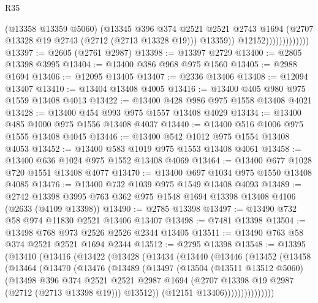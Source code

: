 \begin{lexlean}{R35}
\begin{coremodule}
                                (@13358 @13359 @5060)
                                (@13345
                                  @396
                                  @374
                                  @2521
                                  @2521
                                  @2743
                                  @1694
                                  (@2707 @13328 @19 @2743 (@2712 (@2713 @13328 @19)))
                                  @13359))
                              @12152)))))))))))))
@13397 := @2605 (@2761 @2987)
@13398 := @13397 @2729
@13400 := @2805 @13398 @3995
@13404 := @13400 @386 @968 @975 @1560
@13405 := @2988 @1694
@13406 := @12095 @13405
@13407 := @2336 @13406
@13408 := @12094 @13407
@13410 := @13404 @13408 @4005
@13416 := @13400 @405 @980 @975 @1559 @13408 @4013
@13422 := @13400 @428 @986 @975 @1558 @13408 @4021
@13428 := @13400 @454 @993 @975 @1557 @13408 @4029
@13434 := @13400 @485 @1000 @975 @1556 @13408 @4037
@13440 := @13400 @516 @1006 @975 @1555 @13408 @4045
@13446 := @13400 @542 @1012 @975 @1554 @13408 @4053
@13452 := @13400 @583 @1019 @975 @1553 @13408 @4061
@13458 := @13400 @636 @1024 @975 @1552 @13408 @4069
@13464 := @13400 @677 @1028 @720 @1551 @13408 @4077
@13470 := @13400 @697 @1034 @975 @1550 @13408 @4085
@13476 := @13400 @732 @1039 @975 @1549 @13408 @4093
@13489 := @2742 @13398 @3995 @763 @362 @975 @1548 @1694 @13398 @13408 @4106 (@2633 (@4109 @13398))
@13490 := @2785 @13398
@13497 := @13490 @732 @58 @974 @11830 @2521 @13406 @13407
@13498 := @7481 @13398
@13504 := @13498 @768 @973 @2526 @2526 @2344 @13405
@13511 := @13490 @763 @58 @374 @2521 @2521 @1694 @2344
@13512 := @2795 @13398
@13548 := @13395
    (@13410
      (@13416
        (@13422
          (@13428
            (@13434
              (@13440
                (@13446
                  (@13452
                    (@13458
                      (@13464
                        (@13470
                          (@13476
                            (@13489
                              (@13497
                                (@13504
                                  (@13511 @13512 @5060)
                                  (@13498
                                    @396
                                    @374
                                    @2521
                                    @2521
                                    @2987
                                    @1694
                                    (@2707 @13398 @19 @2987 (@2712 (@2713 @13398 @19)))
                                    @13512))
                                (@12151 @13406)))))))))))))))

\end{coremodule}
\end{lexlean}
